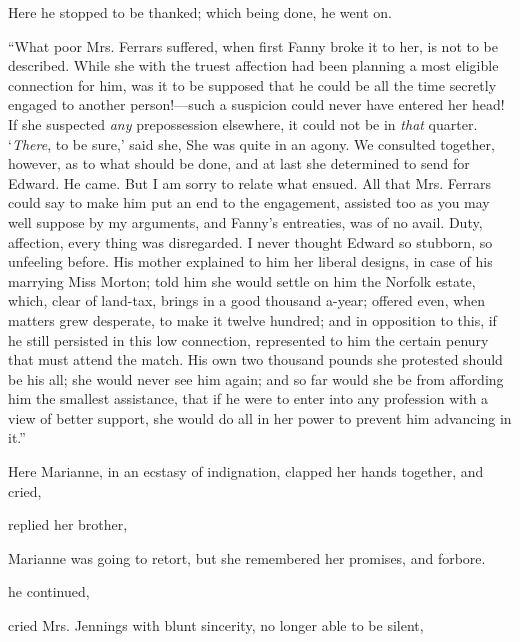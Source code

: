 Here he stopped to be thanked; which being done, he went on.

“What poor Mrs. Ferrars suffered, when first Fanny broke it to her, is not to be described. While she with the truest affection had been planning a most eligible connection for him, was it to be supposed that he could be all the time secretly engaged to another person!---such a suspicion could never have entered her head! If she suspected {\em any} prepossession elsewhere, it could not be in {\em that} quarter. ‘{\em There}, to be sure,' said she,  She was quite in an agony. We consulted together, however, as to what should be done, and at last she determined to send for Edward. He came. But I am sorry to relate what ensued. All that Mrs. Ferrars could say to make him put an end to the engagement, assisted too as you may well suppose by my arguments, and Fanny's entreaties, was of no avail. Duty, affection, every thing was disregarded. I never thought Edward so stubborn, so unfeeling before. His mother explained to him her liberal designs, in case of his marrying Miss Morton; told him she would settle on him the Norfolk estate, which, clear of land-tax, brings in a good thousand a-year; offered even, when matters grew desperate, to make it twelve hundred; and in opposition to this, if he still persisted in this low connection, represented to him the certain penury that must attend the match. His own two thousand pounds she protested should be his all; she would never see him again; and so far would she be from affording him the smallest assistance, that if he were to enter into any profession with a view of better support, she would do all in her power to prevent him advancing in it.”

Here Marianne, in an ecstasy of indignation, clapped her hands together, and cried, 

 replied her brother, 

Marianne was going to retort, but she remembered her promises, and forbore.

 he continued, 

 cried Mrs. Jennings with blunt sincerity, no longer able to be silent, 

